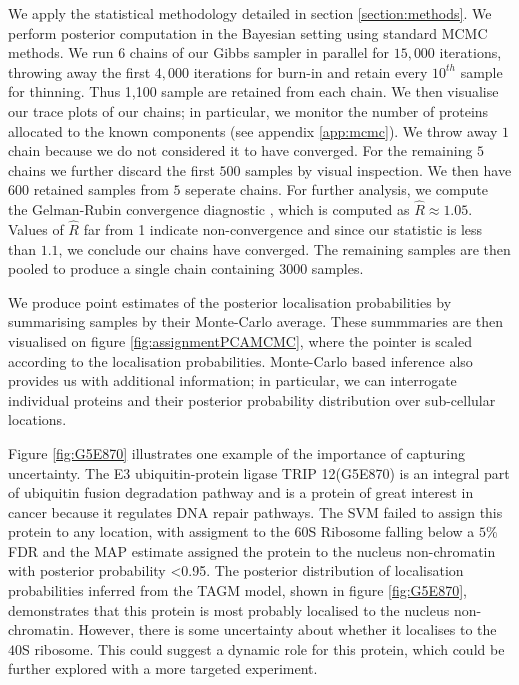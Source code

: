 \documentclass[12pt,english]{article}\usepackage[]{graphicx}\usepackage[]{color}
\begin{document}
We apply the statistical methodology detailed in section \ref{section:methods}.
We perform posterior computation in the Bayesian setting using standard MCMC methods.
We run $6$ chains of our Gibbs sampler in parallel for $15,000$ iterations, throwing away
the first $4,000$ iterations for burn-in and retain every $10^{th}$ sample for thinning.
Thus 1,100 sample are retained from each chain. We then visualise our trace plots of our chains;
in particular, we monitor the number of proteins allocated to the known components
(see appendix \ref{app:mcmc}). We throw away $1$ chain because we do not considered it to have converged.
For the remaining $5$ chains we further discard the first $500$ samples by visual inspection.
We then have $600$ retained samples from $5$ seperate chains. For further analysis, we compute
the Gelman-Rubin convergence diagnostic \citep{Gelman:1992, Brooks:1998}, which is computed as $\hat{R} \approx 1.05$.
Values of $\hat{R}$ far from 1 indicate non-convergence and since our statistic is less than $1.1$, we conclude our chains have converged. The remaining samples are then pooled to produce a single chain containing $3000$ samples.

We produce point estimates of the posterior localisation probabilities by
summarising samples by their Monte-Carlo average.
These summmaries are then visualised on figure \ref{fig:assignmentPCAMCMC}, where the pointer is scaled
according to the localisation probabilities. Monte-Carlo based inference also provides us with
additional information; in particular, we can interrogate individual proteins and their
posterior probability distribution over sub-cellular locations.

Figure \ref{fig:G5E870} illustrates one example of the importance of capturing uncertainty.
The E3 ubiquitin-protein ligase TRIP 12(G5E870) is an integral part of ubiquitin fusion degradation
pathway and is a protein of great interest in cancer because it regulates DNA repair pathways. The SVM
failed to assign this protein to any location, with assigment to the 60S Ribosome falling below a
$5\%$ FDR and the MAP estimate assigned the protein to the nucleus non-chromatin with posterior probability <0.95.
The posterior distribution of localisation probabilities inferred from the TAGM model, shown in figure \ref{fig:G5E870},
demonstrates that this protein is most probably localised to the nucleus non-chromatin. However, there is some uncertainty about whether it localises to the $40$S ribosome.
This could suggest a dynamic role for
this protein, which could be further explored with a more targeted experiment.
\end{document}
